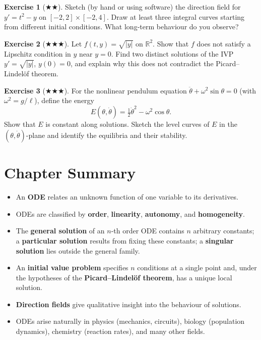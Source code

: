\documentclass[12pt,a4paper,openany]{book}
\theoremstyle{definition}
\newtheorem{exercise}{Exercise}[chapter]
\theoremstyle{plain}
\theoremstyle{remark}
\newcommand{\R}{\mathbb{R}}
\newcommand{\abs}[1]{\left|#1\right|}
\begin{document}
\begin{exercise}[$\bigstar\bigstar$]
\label{exer:ch1-direction-field}
Sketch (by hand or using software) the direction field for $y' = t^2 - y$ on $[-2,2]\times[-2,4]$. Draw at least three integral curves starting from different initial conditions. What long-term behaviour do you observe?
\end{exercise}

\begin{exercise}[$\bigstar\bigstar\bigstar$]
\label{exer:ch1-lipschitz}
Let $f(t,y) = \sqrt{\abs{y}}$ on $\R^2$. Show that $f$ does not satisfy a Lipschitz condition in $y$ near $y=0$. Find two distinct solutions of the IVP $y' = \sqrt{\abs{y}}$, $y(0) = 0$, and explain why this does not contradict the Picard--Lindel\"of theorem.
\end{exercise}

\begin{exercise}[$\bigstar\bigstar\bigstar$]
\label{exer:ch1-pendulum-energy}
For the nonlinear pendulum equation $\ddot{\theta} + \omega^2\sin\theta = 0$ (with $\omega^2 = g/\ell$), define the energy
\[
  E(\theta,\dot{\theta}) = \tfrac{1}{2}\dot{\theta}^2 - \omega^2\cos\theta.
\]
Show that $E$ is constant along solutions. Sketch the level curves of $E$ in the $(\theta,\dot{\theta})$-plane and identify the equilibria and their stability.
\end{exercise}

\section*{Chapter Summary}

\begin{itemize}[leftmargin=1.5cm]
  \item An \textbf{ODE} relates an unknown function of one variable to its derivatives.
  \item ODEs are classified by \textbf{order}, \textbf{linearity}, \textbf{autonomy}, and \textbf{homogeneity}.
  \item The \textbf{general solution} of an $n$-th order ODE contains $n$ arbitrary constants; a \textbf{particular solution} results from fixing these constants; a \textbf{singular solution} lies outside the general family.
  \item An \textbf{initial value problem} specifies $n$ conditions at a single point and, under the hypotheses of the \textbf{Picard--Lindel\"of theorem}, has a unique local solution.
  \item \textbf{Direction fields} give qualitative insight into the behaviour of solutions.
  \item ODEs arise naturally in physics (mechanics, circuits), biology (population dynamics), chemistry (reaction rates), and many other fields.
\end{itemize}
\end{document}
